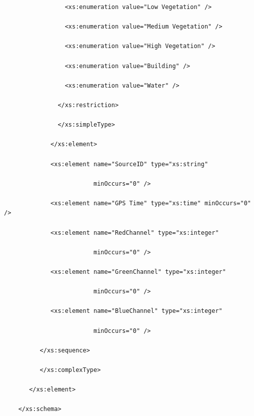 \begin{verbatim}
                 <xs:enumeration value="Low Vegetation" />

                 <xs:enumeration value="Medium Vegetation" />

                 <xs:enumeration value="High Vegetation" />

                 <xs:enumeration value="Building" />

                 <xs:enumeration value="Water" />

               </xs:restriction>

               </xs:simpleType>

             </xs:element>

             <xs:element name="SourceID" type="xs:string"

                         minOccurs="0" />

             <xs:element name="GPS Time" type="xs:time" minOccurs="0" />

             <xs:element name="RedChannel" type="xs:integer"

                         minOccurs="0" />

             <xs:element name="GreenChannel" type="xs:integer"

                         minOccurs="0" />

             <xs:element name="BlueChannel" type="xs:integer"

                         minOccurs="0" />

          </xs:sequence>

          </xs:complexType>

       </xs:element>

    </xs:schema>

\end{verbatim}




